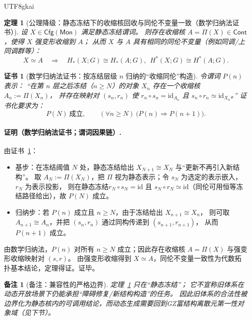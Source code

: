 \documentclass[12pt]{article}
\newtheorem{theorem}{定理}[section]
\newtheorem{remark}{备注}[section]
\newtheorem{Certificate}{证书}[section]
\newcommand{\KouJing}{\texorpdfstring{表述约定}{表述约定}}
\newcommand{\GZMon}{\texorpdfstring{GZ富结构离散元}{GZ富结构离散元}}
\begin{document}
\begin{CJK*}{UTF8}{gkai}
\begin{theorem}[公理降级：静态冻结下的收缩核回收与同伦不变量一致（数学归纳法证书）]
\label{thm:tex29-core-contraction-theorem}
设 $X\in\mathsf{Cfg}(\mathsf{Mon})$ 满足静态冻结谓词。
则存在收缩核 $A=\Pi(X)\in\mathsf{Cont}$，使得 $X$ 强变形收缩到 $A$；
从而 $X$ 与 $A$ 具有相同的同伦不变量（例如同调/上同调群等）：
\[
  X\simeq A\quad\Longrightarrow\quad H_\ast(X;G)\cong H_\ast(A;G),\ \ H^\ast(X;G)\cong H^\ast(A;G).
\]
\end{theorem}

\begin{Certificate}[数学归纳法证书：按冻结层级 $n$ 归纳的“收缩同伦”构造]
\label{cert:tex29-core-contraction-theorem}
令谓词 $P(n)$ 表示：
“在第 $n$ 层之后冻结（$n\ge N$）的对象 $X_n$ 存在一个收缩核 $A_n:=\Pi(X_n)$，
并存在映射对 $(s_n,r_n)$ 使 $r_n\circ s_n=\mathrm{id}_{A_n}$ 且 $s_n\circ r_n\simeq \mathrm{id}_{X_n}$。”
证书化要求为：
\[
  P(N)\ \text{成立},\qquad (\forall n\ge N)\ \bigl(P(n)\Rightarrow P(n+1)\bigr).
\]
\end{Certificate}

\paragraph{证明（数学归纳法证书；谓词因果链）.}
由证书~\ref{cert:tex29-core-contraction-theorem}：
\begin{itemize}
  \item 基步：在冻结阈值 $N$ 处，静态冻结给出 $X_{N+1}\cong X_N$ 与“更新不再引入新结构”。
  取 $A_N:=\Pi(X_N)$，把 $\Pi$ 视为静态表示；令 $s_N$ 为选定的表示嵌入，$r_N$ 为表示投影，
  则在静态冻结 $r_N\circ s_N=\mathrm{id}$ 且 $s_N\circ r_N\simeq \mathrm{id}$（同伦可用恒等冻结路径给出），故 $P(N)$ 成立。
  \item 归纳步：若 $P(n)$ 成立且 $n\ge N$，由于冻结给出 $X_{n+1}\cong X_n$，
  则可取 $A_{n+1}\cong A_n$，并把 $(s_n,r_n)$ 通过同构传递到 $(s_{n+1},r_{n+1})$，
  从而 $P(n+1)$ 成立。
\end{itemize}
由数学归纳法，$P(n)$ 对所有 $n\ge N$ 成立；因此存在收缩核 $A=\Pi(X)$ 与强变形收缩映射对 $(s,r)$。
由强变形收缩得到 $X\simeq A$，同伦不变量一致性为代数拓扑基本结论，定理得证。证毕。

\begin{remark}[备注：兼容性的严格边界]
定理~\ref{thm:tex29-core-contraction-theorem} 只在“静态冻结”；
它不宣称旧体系在动态开放场景下仍能承担“障碍修复/新结构构造”的任务。
因此旧体系的合法性被\emph{边界化}为静态核内的可调用结论，而动态生成需要回到\GZMon{}第一性对象域（见下节）。
\end{remark}


\end{CJK*}
\end{document}
